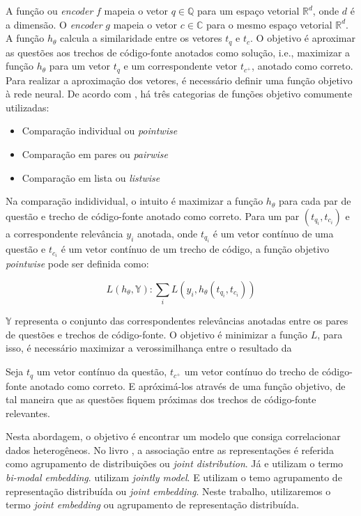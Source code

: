 A função ou \textit{encoder} $f$ mapeia o vetor $q \in \mathbb{Q}$ para um espaço vetorial $\mathbb{R}^{d}$, onde $d$ é a dimensão. O \textit{encoder} $g$ mapeia o vetor $c \in \mathbb{C}$ para o mesmo espaço vetorial $\mathbb{R}^{d}$. A função $h_{\theta}$ calcula a similaridade entre os vetores $t_{q}$ e $t_{c}$. O objetivo é aproximar as questões aos trechos de código-fonte anotados como solução, i.e., maximizar a função $h_{\theta}$ para um vetor $t_{q}$ e um correspondente vetor $t_{c^{+}}$, anotado como correto. Para realizar a aproximação dos vetores, é necessário definir uma função objetivo à rede neural. De acordo com \cite{guo-deep-look-into-neural-ranking-models:2019}, há três categorias de funções objetivo comumente utilizadas:

\begin{itemize}
    \item Comparação individual ou \textit{pointwise}
    \item Comparação em pares ou \textit{pairwise}
    \item Comparação em lista ou \textit{listwise}
\end{itemize}

Na comparação indidividual, o intuito é maximizar a função $h_{\theta}$ para cada par de questão e trecho de código-fonte anotado como correto. Para um par $(t_{q_{i}}, t_{c_{i}})$ e a correspondente relevância $y_{i}$ anotada, onde $t_{q_{i}}$ é um vetor contínuo de uma questão e $t_{c_{i}}$ é um vetor contínuo de um trecho de código, a função objetivo \textit{pointwise} pode ser definida como:

\begin{equation}
    L (h_{\theta}, \mathbb{Y}): \sum_{i} L(y_{i}, h_{\theta}(t_{q_{i}}, t_{c_{i}})) 
\end{equation}

$\mathbb{Y}$ representa o conjunto das correspondentes relevâncias anotadas entre os pares de questões e trechos de código-fonte. O objetivo é minimizar a função $L$, para isso, é necessário maximizar a verossimilhança entre o resultado da 

Seja $t_{q}$ um vetor contínuo da questão, $t_{c^{+}}$ um vetor contínuo do trecho de código-fonte anotado como correto. 
E apróximá-los através de uma função objetivo, de tal maneira que as questões fiquem próximas dos trechos de código-fonte relevantes. 

Nesta abordagem, o objetivo é encontrar um modelo que consiga correlacionar dados heterogêneos. No livro \cite{Goodfellow-et-al-2016}, a associação entre as representações é referida como agrupamento de distribuições ou \textit{joint distribution}. Já \cite{cambronero-deep-learning-code-search:2019} e \cite{Allamanis-bimodal-source-code-natural-language:2015} utilizam o termo \textit{bi-modal embedding}. \cite{Zhang:2019:deep-learning-recommender-survey} utilizam \textit{jointly model}. E \cite{Gu-deep-code-search:2018} utilizam o temo agrupamento de representação distribuída ou \textit{joint embedding}. Neste trabalho, utilizaremos o termo \textit{joint embedding} ou agrupamento de representação distribuída.


